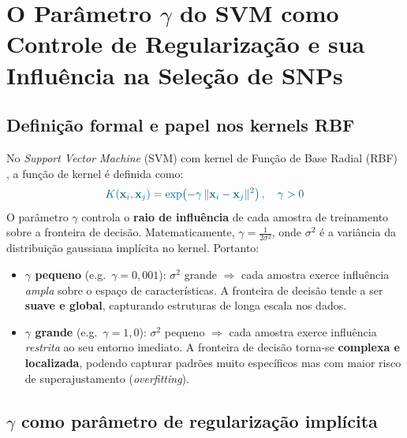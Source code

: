 \documentclass[
    12pt,
    a4paper,
    oneside,
    english,
    french,
    spanish,
    brazil
    ]{abntex2}
\newcommand{\novo}[1]{\textcolor{corNova}{#1}}
\begin{document}
\chapter*{O Parâmetro $\gamma$ do SVM como Controle de Regularização e sua Influência na Seleção de SNPs}

\section*{Definição formal e papel nos kernels RBF}

\novo{No \textit{Support Vector Machine} (SVM) com kernel de Função de Base Radial (RBF) \cite{vapnik95,burges1998tutorial,cristianini2000introduction}, a função de kernel é definida como:}
\begin{equation}
  \novo{K(\mathbf{x}_i, \mathbf{x}_j) = \exp\!\left(-\gamma \,\|\mathbf{x}_i - \mathbf{x}_j\|^2\right), \quad \gamma > 0}
  \label{eq:kernel-rbf}
\end{equation}
\novo{O parâmetro $\gamma$ controla o \textbf{raio de influência} de cada amostra de treinamento sobre a fronteira de decisão. Matematicamente, $\gamma = \frac{1}{2\sigma^2}$, onde $\sigma^2$ é a variância da distribuição gaussiana implícita no kernel. Portanto:}
\begin{itemize}
  \item \novo{\textbf{$\gamma$ pequeno} (e.g.\ $\gamma = 0{,}001$): $\sigma^2$ grande $\Rightarrow$ cada amostra exerce influência \emph{ampla} sobre o espaço de características. A fronteira de decisão tende a ser \textbf{suave e global}, capturando estruturas de longa escala nos dados.}
  \item \novo{\textbf{$\gamma$ grande} (e.g.\ $\gamma = 1{,}0$): $\sigma^2$ pequeno $\Rightarrow$ cada amostra exerce influência \emph{restrita} ao seu entorno imediato. A fronteira de decisão torna-se \textbf{complexa e localizada}, podendo capturar padrões muito específicos mas com maior risco de superajustamento (\textit{overfitting}).}
\end{itemize}

\section*{$\gamma$ como parâmetro de regularização implícita}
\end{document}
